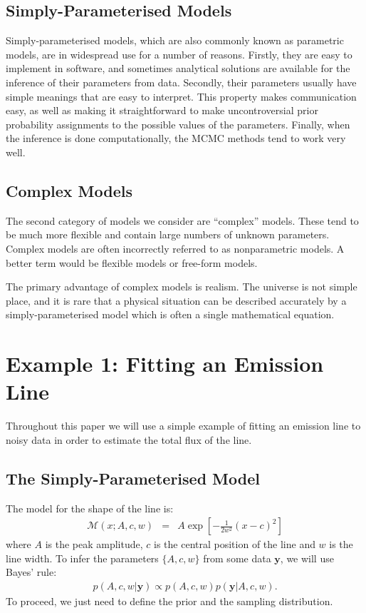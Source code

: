\documentclass[letterpaper, 11pt]{article}
\newcommand{\yy}{\mathbf{y}}
\begin{document}
\subsection{Simply-Parameterised Models}
Simply-parameterised models, which are also
commonly known as parametric models, are in widespread use for a number of reasons.
Firstly, they are easy to implement in software, and sometimes analytical
solutions are available for the inference of their parameters from data.
Secondly, their parameters usually have simple meanings that are easy to interpret.
This property makes communication easy, as well as making it straightforward to
make uncontroversial prior probability
assignments to the possible values of the parameters. Finally, when the inference
is done computationally, the MCMC methods tend to work very well.

\subsection{Complex Models}
The second category of models we consider are ``complex'' models. These tend to
be much more flexible and contain large numbers of unknown parameters. Complex
models are often incorrectly referred to as nonparametric models. A better term
would be flexible models or free-form models.

The primary advantage of complex models is realism. The universe is not
simple place, and it is rare that a physical situation can be described accurately
by a simply-parameterised model which is often a single mathematical equation.

\section{Example 1: Fitting an Emission Line}
Throughout this paper we will use a simple example of fitting an emission line
to noisy data in order to estimate the total flux of the line.

\subsection{The Simply-Parameterised Model}
The model for the shape of the line is:
\begin{eqnarray}
\mathcal{M}(x; A, c, w) &=&
A\exp
\left[
-\frac{1}{2w^2}
\left(x - c\right)^2
\right]
\end{eqnarray}
where $A$ is the peak amplitude, $c$ is the central position of the line
and $w$ is the line width. To infer the parameters $\{A, c, w\}$ from some data
$\yy$, we will use Bayes' rule:
\begin{eqnarray}
p(A, c, w | \yy) \propto p(A, c, w)p(\yy | A, c, w).
\end{eqnarray}
To proceed, we just need to define the prior and the sampling distribution.
\end{document}
